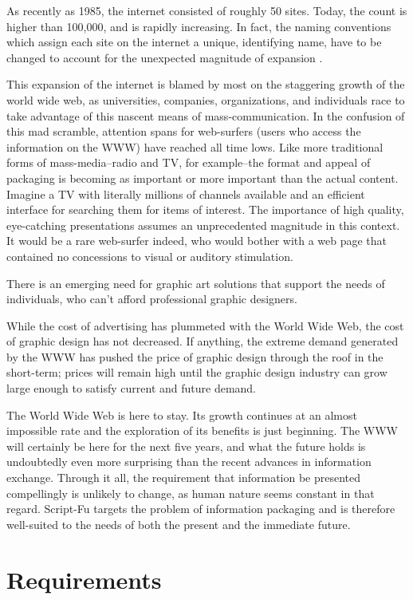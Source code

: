 \documentclass{article}
\makeatletter
\newcommand{\myfigtwo}[3]{
	\def\@captype{figure}
	\begin{table*}
	\bigskip
        \begin{center}
	\leavevmode
	\epsfysize=#2 \epsfbox{#1.eps}
	\caption{#3} \label{#1}
	\end{center}
	\end{table*}}
\makeatother
\begin{document}
As recently as 1985, the internet consisted of roughly 50 sites.
Today, the count is higher than 100,000, and is rapidly increasing.
In fact, the naming conventions which assign each site on the internet
a unique, identifying name, have to be changed to account for the
unexpected magnitude of expansion \cite{ipv6}.

This expansion of the internet is blamed by most on the staggering
growth of the world wide web, as universities, companies,
organizations, and individuals race to take advantage of this nascent
means of mass-communication.  In the confusion of this mad scramble,
attention spans for web-surfers (users who access the information on
the WWW) have reached all time lows.  Like more traditional forms of
mass-media--radio and TV, for example--the format and appeal of
packaging is becoming as important or more important than the actual
content.  Imagine a TV with literally millions of channels available
and an efficient interface for searching them for items of interest.
The importance of high quality, eye-catching presentations assumes an
unprecedented magnitude in this context.  It would be a rare
web-surfer indeed, who would bother with a web page that contained no
concessions to visual or auditory stimulation.

\myfigtwo{timeline}{6cm}{There is an emerging need for graphic art
solutions that support the needs of individuals, who can't afford
professional graphic designers.}

While the cost of advertising has plummeted with the World Wide Web,
the cost of graphic design has not decreased.  If anything, the
extreme demand generated by the WWW has pushed the price of graphic
design through the roof in the short-term; prices will remain high
until the graphic design industry can grow large enough to satisfy
current and future demand.

The World Wide Web is here to stay.  Its growth continues at an almost
impossible rate and the exploration of its benefits is just beginning.
The WWW will certainly be here for the next five years, and what the
future holds is undoubtedly even more surprising than the recent
advances in information exchange.  Through it all, the requirement
that information be presented compellingly is unlikely to change, as
human nature seems constant in that regard.  Script-Fu targets the
problem of information packaging and is therefore well-suited to the
needs of both the present and the immediate future.

\section{Requirements}
\end{document}
